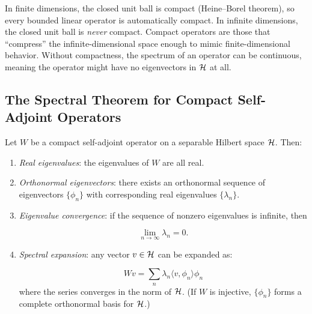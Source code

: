 \begin{remark}
In finite dimensions, the closed unit ball is compact (Heine--Borel theorem), so every bounded linear operator is automatically compact. In infinite dimensions, the closed unit ball is \textit{never} compact. Compact operators are those that ``compress'' the infinite-dimensional space enough to mimic finite-dimensional behavior. Without compactness, the spectrum of an operator can be continuous, meaning the operator might have no eigenvectors in $\mathcal{H}$ at all.
\end{remark}

\subsection{The Spectral Theorem for Compact Self-Adjoint Operators}

\begin{theorem}
Let $W$ be a compact self-adjoint operator on a separable Hilbert space $\mathcal{H}$. Then:
\begin{enumerate}
\item \textit{Real eigenvalues}: the eigenvalues of $W$ are all real.
\item \textit{Orthonormal eigenvectors}: there exists an orthonormal sequence of eigenvectors $\{\phi_n\}$ with corresponding real eigenvalues $\{\lambda_n\}$.
\item \textit{Eigenvalue convergence}: if the sequence of nonzero eigenvalues is infinite, then

\[
\lim_{n \to \infty} \lambda_n = 0.
\]

\item \textit{Spectral expansion}: any vector $v \in \mathcal{H}$ can be expanded as:

\begin{equation}
Wv = \sum_{n} \lambda_n \langle v, \phi_n \rangle \phi_n
\end{equation}
where the series converges in the norm of $\mathcal{H}$. (If $W$ is injective, $\{\phi_n\}$ forms a complete orthonormal basis for $\mathcal{H}$.)
\end{enumerate}
\end{theorem}

